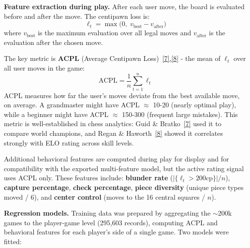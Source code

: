 \documentclass[a4paper]{article}
\begin{document}
\textbf{Feature extraction during play.}
After each user move, the board is evaluated before and after the move. The centipawn loss is:
\[
  \ell_t = \max\!\bigl(0,\; v_{\text{best}} - v_{\text{after}}\bigr)
\]
where $v_{\text{best}}$ is the maximum evaluation over all legal moves and $v_{\text{after}}$ is the evaluation after the chosen move.

The key metric is \textbf{ACPL} (Average Centipawn Loss)~\hyperlink{ref7}{[7],}\hyperlink{ref8}{[8]} - the mean of $\ell_t$ over all user moves in the game:
\[
  \text{ACPL} = \frac{1}{n}\sum_{t=1}^{n} \ell_t
\]
ACPL measures how far the user's moves deviate from the best available move, on average. A grandmaster might have ACPL $\approx$ 10-20 (nearly optimal play), while a beginner might have ACPL $\approx$ 150-300 (frequent large mistakes). This metric is well-established in chess analytics: Guid \& Bratko~\hyperlink{ref7}{[7]} used it to compare world champions, and Regan \& Haworth~\hyperlink{ref8}{[8]} showed it correlates strongly with ELO rating across skill levels.

Additional behavioral features are computed during play for display and for compatibility with the exported multi-feature model, but the active rating signal uses ACPL only. These features include: \textbf{blunder rate} ($|\{\ell_t > 200\text{cp}\}|/n$), \textbf{capture percentage}, \textbf{check percentage}, \textbf{piece diversity} (unique piece types moved / 6), and \textbf{center control} (moves to the 16 central squares / $n$).

\textbf{Regression models.}
Training data was prepared by aggregating the $\sim$200k games to the player-game level (295,603 records), computing ACPL and behavioral features for each player's side of a single game. Two models were fitted:
\end{document}
